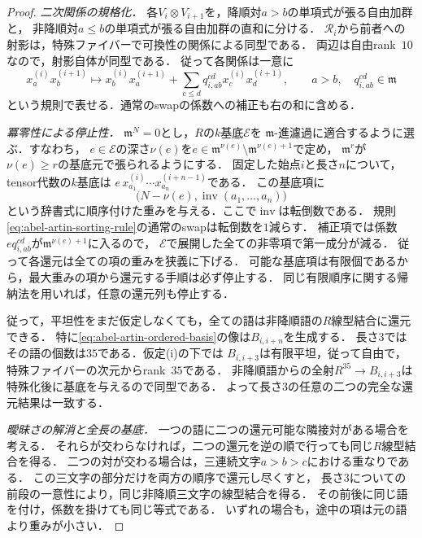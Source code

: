 \begin{proof}
\emph{二次関係の規格化．}
各$V_i\otimes V_{i+1}$を，降順対$a>b$の単項式が張る自由加群と，
非降順対$a\leq b$の単項式が張る自由加群の直和に分ける．
$\mathcal R_i$から前者への射影は，特殊ファイバーで可換性の関係による同型である．
両辺は自由rank~$10$なので，射影自体が同型である．
従って各関係は一意に
\begin{equation}\label{eq:abel-artin-sorting-rule}
 x_a^{(i)}x_b^{(i+1)}
  \longmapsto
 x_b^{(i)}x_a^{(i+1)}+
 \sum_{c\leq d}q_{i,ab}^{cd}x_c^{(i)}x_d^{(i+1)},
 \qquad a>b,\quad q_{i,ab}^{cd}\in\mathfrak m
\end{equation}
という規則で表せる．通常のswapの係数への補正も右の和に含める．

\emph{冪零性による停止性．}
$\mathfrak m^N=0$とし，$R$の$k$基底$\mathcal E$を
$\mathfrak m$-進濾過に適合するように選ぶ．すなわち，
$e\in\mathcal E$の深さ$\nu(e)$を$e\in\mathfrak m^{\nu(e)}
\setminus\mathfrak m^{\nu(e)+1}$で定め，
$\mathfrak m^r$が$\nu(e)\geq r$の基底元で張られるようにする．
固定した始点$i$と長さ$n$について，tensor代数の$k$基底は
$e\,x_{a_1}^{(i)}\cdots x_{a_n}^{(i+n-1)}$である．
この基底項に
\[
 \bigl(N-\nu(e),\operatorname{inv}(a_1,\ldots,a_n)\bigr)
\]
という辞書式に順序付けた重みを与える．ここで$\operatorname{inv}$は転倒数である．
規則\eqref{eq:abel-artin-sorting-rule}の通常のswapは転倒数を$1$減らす．
補正項では係数$e q_{i,ab}^{cd}$が$\mathfrak m^{\nu(e)+1}$に入るので，
$\mathcal E$で展開した全ての非零項で第一成分が減る．
従って各還元は全ての項の重みを狭義に下げる．
可能な基底項は有限個であるから，最大重みの項から還元する手順は必ず停止する．
同じ有限順序に関する帰納法を用いれば，任意の還元列も停止する．

従って，平坦性をまだ仮定しなくても，全ての語は非降順語の$R$線型結合に還元できる．
特に\eqref{eq:abel-artin-ordered-basis}の像は$B_{i,i+n}$を生成する．
長さ$3$ではその語の個数は$35$である．仮定\textup{(i)}の下では
$B_{i,i+3}$は有限平坦，従って自由で，特殊ファイバーの次元からrank~$35$である．
非降順語からの全射$R^{35}\to B_{i,i+3}$は特殊化後に基底を与えるので同型である．
よって長さ$3$の任意の二つの完全な還元結果は一致する．

\emph{曖昧さの解消と全長の基底．}
一つの語に二つの還元可能な隣接対がある場合を考える．
それらが交わらなければ，二つの還元を逆の順で行っても同じ$R$線型結合を得る．
二つの対が交わる場合は，三連続文字$a>b>c$における重なりである．
この三文字の部分だけを両方の順序で還元し尽くすと，
長さ$3$についての前段の一意性により，同じ非降順三文字の線型結合を得る．
その前後に同じ語を付け，係数を掛けても同じ等式である．
いずれの場合も，途中の項は元の語より重みが小さい．


\end{proof}
